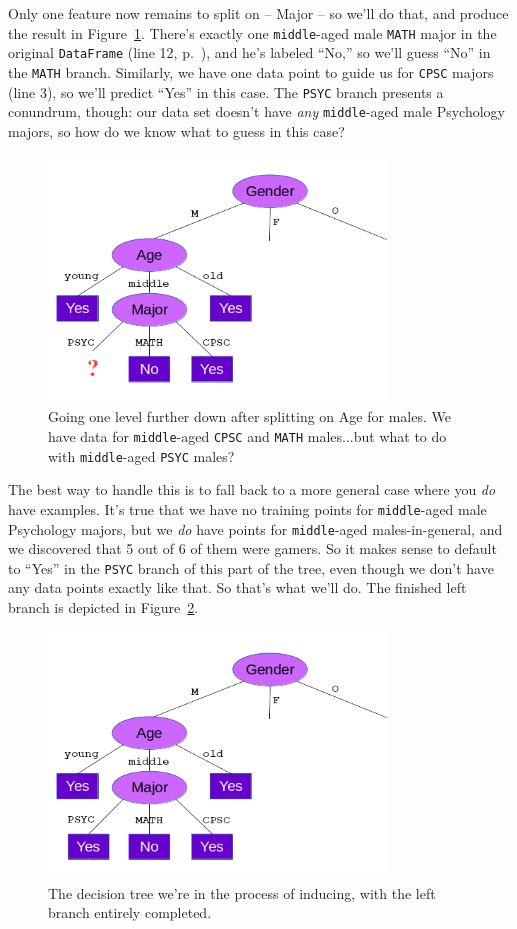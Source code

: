 Only one feature now remains to split on -- \textsf{Major} -- so we'll do that,
and produce the result in Figure~\ref{fig:maleAgeMiddle}. There's exactly one
\texttt{middle}-aged male \texttt{MATH} major in the original
\texttt{DataFrame} (line 12, p.~\pageref{vgDataSet}), and he's labeled ``No,''
so we'll guess ``No'' in the \texttt{MATH} branch. Similarly, we have one data
point to guide us for \texttt{CPSC} majors (line 3), so we'll predict ``Yes''
in this case. The \texttt{PSYC} branch presents a conundrum, though: our data
set doesn't have \textit{any} \texttt{middle}-aged male Psychology majors, so
how do we know what to guess in this case?

\begin{figure}[ht]
\centering
\includegraphics[width=0.8\textwidth]{maleAgeMiddle.png}
\caption{Going one level further down after splitting on \textsf{Age} for
males. We have data for \texttt{middle}-aged \texttt{CPSC} and \texttt{MATH}
males...but what to do with \texttt{middle}-aged \texttt{PSYC} males?}
\label{fig:maleAgeMiddle}
\end{figure}

The best way to handle this is to fall back to a more general case where you
\textit{do} have examples. It's true that we have no training points for
\texttt{middle}-aged male Psychology majors, but we \textit{do} have points for
\texttt{middle}-aged males-in-general, and we discovered that 5 out of 6 of
them were gamers. So it makes sense to default to ``Yes'' in the \texttt{PSYC}
branch of this part of the tree, even though we don't have any data points
exactly like that. So that's what we'll do. The finished left branch is
depicted in Figure~\ref{fig:maleAgeMiddleWithPsyc}.

\begin{figure}[ht]
\centering
\includegraphics[width=0.8\textwidth]{maleAgeMiddleWithPsyc.png}
\caption{The decision tree we're in the process of inducing, with the left
branch entirely completed.}
\label{fig:maleAgeMiddleWithPsyc}
\end{figure}


